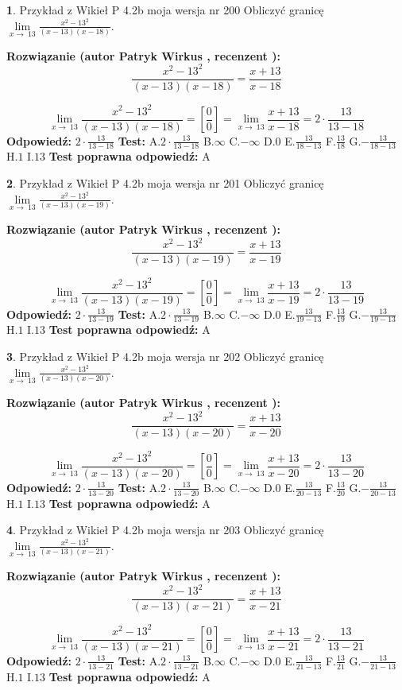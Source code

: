 \documentclass[12pt, a4paper]{article}
\theoremstyle{definition} %
\newtheorem{zad}{}
\newcommand{\zadStart}[1]{\begin{zad}#1\newline}
\newcommand{\zadStop}{\end{zad}}
\newcommand{\rozwStart}[2]{\noindent \textbf{Rozwiązanie (autor #1 , recenzent #2): }\newline}
\newcommand{\rozwStop}{\newline}
\newcommand{\odpStart}{\noindent \textbf{Odpowiedź:}\newline}
\newcommand{\odpStop}{\newline}
\newcommand{\testStart}{\noindent \textbf{Test:}\newline}
\newcommand{\testStop}{\newline}
\newcommand{\kluczStart}{\noindent \textbf{Test poprawna odpowiedź:}\newline}
\newcommand{\kluczStop}{\newline}
\begin{document}
\zadStart{Przykład z Wikieł P 4.2b moja wersja nr 200}
Obliczyć granicę $\lim\limits_{x\to\ 13}\frac{x^{2}-13^{2}}{(x-13)(x-18)}$.
\zadStop
\rozwStart{Patryk Wirkus}{}
$$\frac{x^{2}-13^{2}}{(x-13)(x-18)}=\frac{x+13}{x-18}$$

$$\lim\limits_{x\to\ 13}\frac{x^{2}-13^{2}}{(x-13)(x-18)}=[\frac{0}{0}]=\lim\limits_{x\to\ 13}\frac{x+13}{x-18}=2 \cdot \frac{13}{13-18}$$
\rozwStop
\odpStart
$2 \cdot \frac{13}{13-18}$
\odpStop
\testStart
A.$2 \cdot \frac{13}{13-18}$
B.$\infty$
C.$-\infty$
D.$0$
E.$\frac{13}{18-13}$
F.$\frac{13}{18}$
G.$-\frac{13}{18-13}$
H.$1$
I.$13$
\testStop
\kluczStart
A
\kluczStop



\zadStart{Przykład z Wikieł P 4.2b moja wersja nr 201}
Obliczyć granicę $\lim\limits_{x\to\ 13}\frac{x^{2}-13^{2}}{(x-13)(x-19)}$.
\zadStop
\rozwStart{Patryk Wirkus}{}
$$\frac{x^{2}-13^{2}}{(x-13)(x-19)}=\frac{x+13}{x-19}$$

$$\lim\limits_{x\to\ 13}\frac{x^{2}-13^{2}}{(x-13)(x-19)}=[\frac{0}{0}]=\lim\limits_{x\to\ 13}\frac{x+13}{x-19}=2 \cdot \frac{13}{13-19}$$
\rozwStop
\odpStart
$2 \cdot \frac{13}{13-19}$
\odpStop
\testStart
A.$2 \cdot \frac{13}{13-19}$
B.$\infty$
C.$-\infty$
D.$0$
E.$\frac{13}{19-13}$
F.$\frac{13}{19}$
G.$-\frac{13}{19-13}$
H.$1$
I.$13$
\testStop
\kluczStart
A
\kluczStop



\zadStart{Przykład z Wikieł P 4.2b moja wersja nr 202}
Obliczyć granicę $\lim\limits_{x\to\ 13}\frac{x^{2}-13^{2}}{(x-13)(x-20)}$.
\zadStop
\rozwStart{Patryk Wirkus}{}
$$\frac{x^{2}-13^{2}}{(x-13)(x-20)}=\frac{x+13}{x-20}$$

$$\lim\limits_{x\to\ 13}\frac{x^{2}-13^{2}}{(x-13)(x-20)}=[\frac{0}{0}]=\lim\limits_{x\to\ 13}\frac{x+13}{x-20}=2 \cdot \frac{13}{13-20}$$
\rozwStop
\odpStart
$2 \cdot \frac{13}{13-20}$
\odpStop
\testStart
A.$2 \cdot \frac{13}{13-20}$
B.$\infty$
C.$-\infty$
D.$0$
E.$\frac{13}{20-13}$
F.$\frac{13}{20}$
G.$-\frac{13}{20-13}$
H.$1$
I.$13$
\testStop
\kluczStart
A
\kluczStop



\zadStart{Przykład z Wikieł P 4.2b moja wersja nr 203}
Obliczyć granicę $\lim\limits_{x\to\ 13}\frac{x^{2}-13^{2}}{(x-13)(x-21)}$.
\zadStop
\rozwStart{Patryk Wirkus}{}
$$\frac{x^{2}-13^{2}}{(x-13)(x-21)}=\frac{x+13}{x-21}$$

$$\lim\limits_{x\to\ 13}\frac{x^{2}-13^{2}}{(x-13)(x-21)}=[\frac{0}{0}]=\lim\limits_{x\to\ 13}\frac{x+13}{x-21}=2 \cdot \frac{13}{13-21}$$
\rozwStop
\odpStart
$2 \cdot \frac{13}{13-21}$
\odpStop
\testStart
A.$2 \cdot \frac{13}{13-21}$
B.$\infty$
C.$-\infty$
D.$0$
E.$\frac{13}{21-13}$
F.$\frac{13}{21}$
G.$-\frac{13}{21-13}$
H.$1$
I.$13$
\testStop
\kluczStart
A
\kluczStop
\end{document}
